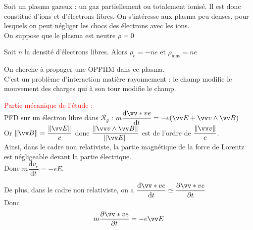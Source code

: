 \documentclass[a4paper]{article}
\begin{document}
\pagestyle{fancy}
\fancyhf{}
\setlength{\headheight}{15pt}

\begin{center}
	\large{}
\end{center}


Soit un plasma gazeux : un gaz partiellement ou totalement ionisé. Il est donc constitué d'ions et d'électrons libres. On s'intéresse aux plasma peu denses, pour lesquels on peut négliger les chocs des électrons avec les ions.\\
On suppose que le plasma est neutre $\rho=0$\par
Soit $n$ la densité d'électrons libres. Alors $\rho_e=-ne$ et $\rho_{\text{ions}}=ne$

On cherche à propager une OPPHM dans ce plasma.\\
C'est un problème d'interaction matière rayonnement : le champ modifie le mouvement des charges qui à son tour modifie le champ.

\textcolor{red}{Partie mécanique de l'étude :}\\
PFD sur un électron libre dans $\mathcal{R}_g$ : $m\dfrac{\mathrm{d}\vv*ve}{\mathrm{d}t}=-e(\vv E+\vv v\wedge\vv B)$\\
Or $\Vert\vv B\Vert=\dfrac{\Vert\vv E\Vert}{c}$ donc $\dfrac{\Vert\vv v\wedge\vv B\Vert}{\Vert\vv E\Vert}$ est de l'ordre de $\dfrac{\Vert\vv v\Vert}{c}$.\\
Ainsi, dans le cadre non relativiste, la partie magnétique de la force de Lorentz est négligeable devant la partie électrique.\\
Donc $m\dfrac{\mathrm{d}v_e}{\mathrm{d}t}=-eE$.\par
De plus, dans le cadre non relativiste, on a $\dfrac{\mathrm{d}\vv*ve}{\mathrm{d}t}\simeq\dfrac{\partial\vv*ve}{\partial t}$\\
Donc \[m\dfrac{\partial\vv*ve}{\partial t}=-e\vv E\]
\end{document}
